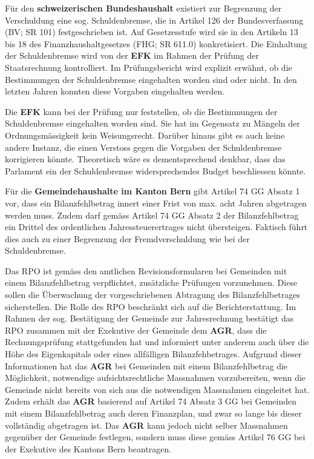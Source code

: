\documentclass[10pt]{article}
\begin{document}
Für den \textbf{schweizerischen Bundeshaushalt} existiert zur Begrenzung der Verschuldung eine sog. Schuldenbremse, die in Artikel 126 der Bundesverfassung (BV; SR 101) festgeschrieben ist. Auf Gesetzesstufe wird sie in den Artikeln 13 bis 18 des Finanzhaushaltgesetzes (FHG; SR 611.0) konkretisiert. Die Einhaltung der Schuldenbremse wird von der \textbf{EFK} im Rahmen der Prüfung der Staatsrechnung kontrolliert. Im Prüfungsbericht wird explizit erwähnt, ob die Bestimmungen der Schuldenbremse eingehalten worden sind oder nicht. In den letzten Jahren konnten diese Vorgaben eingehalten werden.

Die \textbf{EFK} kann bei der Prüfung nur feststellen, ob die Bestimmungen der Schuldenbremse eingehalten worden sind. Sie hat im Gegensatz zu Mängeln der Ordnungsmässigkeit kein Weisungsrecht. Darüber hinaus gibt es auch keine andere Instanz, die einen Verstoss gegen die Vorgaben der Schuldenbremse korrigieren könnte. Theoretisch wäre es dementsprechend denkbar, dass das Parlament ein der Schuldenbremse widersprechendes Budget beschliessen könnte.

Für die \textbf{Gemeindehaushalte im Kanton Bern} gibt Artikel 74 GG Absatz 1 vor, dass ein Bilanzfehlbetrag innert einer Frist von max. acht Jahren abgetragen werden muss. Zudem darf gemäss Artikel 74 GG Absatz 2 der Bilanzfehlbetrag ein Drittel des ordentlichen Jahressteuerertrages nicht übersteigen. Faktisch führt dies auch zu einer Begrenzung der Fremdverschuldung wie bei der Schuldenbremse.

Das RPO ist gemäss den amtlichen Revisions­formularen bei Gemeinden mit einem Bilanzfehlbetrag verpflichtet, zusätzliche Prüfungen vorzunehmen. Diese sollen die Überwachung der vorgeschriebenen Abtragung des Bilanzfehlbetrages sicherstellen. Die Rolle des RPO beschränkt sich auf die Berichterstattung. Im Rahmen der sog. Bestätigung der Gemeinde zur Jahresrechnung bestätigt das RPO zusammen mit der Exekutive der Gemeinde dem \textbf{AGR}, dass die Rechnungsprüfung stattgefunden hat und informiert unter anderem auch über die Höhe des Eigenkapitals oder eines allfälligen Bilanzfehbetrages. Aufgrund dieser Informationen hat das \textbf{AGR} bei Gemeinden mit einem Bilanzfehlbetrag die Möglichkeit, notwendige aufsichtsrechtliche Massnahmen vorzu­bereiten, wenn die Gemeinde nicht bereits von sich aus die notwendigen Massnahmen eingeleitet hat. Zudem erhält das \textbf{AGR} basierend auf Artikel 74 Absatz 3 GG bei Gemeinden mit einem Bilanzfehlbetrag auch deren Finanzplan, und zwar so lange bis dieser vollständig abgetragen ist. Das \textbf{AGR} kann jedoch nicht selber Massnahmen gegenüber der Gemeinde festlegen, sondern muss diese gemäss Artikel 76 GG bei der Exekutive des Kantons Bern beantragen.
\end{document}
